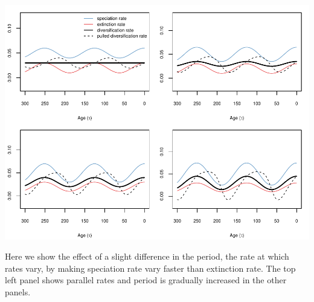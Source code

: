 \documentclass[
]{article}
\begin{document}
\includegraphics{supplement_files/figure-latex/unnamed-chunk-21-1.pdf}

\pagebreak

Here we show the effect of a slight difference in the period, the rate
at which rates vary, by making speciation rate vary faster than
extinction rate. The top left panel shows parallel rates and period is
gradually increased in the other panels.
\end{document}
